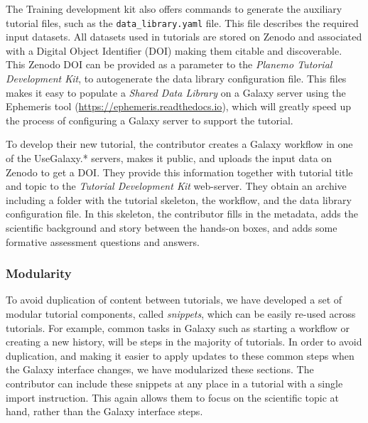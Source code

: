 \documentclass[10pt,letterpaper]{article}
\begin{document}

The Training development kit also offers commands to generate the auxiliary tutorial files, such as the \verb+data_library.yaml+ file.
This file describes the required input datasets. All datasets used in tutorials are stored on Zenodo and associated with a Digital Object Identifier (DOI) making them citable and discoverable.
This Zenodo DOI can be provided as a parameter to the \emph{Planemo Tutorial Development Kit}, to autogenerate the data library configuration file.
This files makes it easy to populate a \emph{Shared Data Library} on a Galaxy server using the Ephemeris tool (\url{https://ephemeris.readthedocs.io}), which will greatly speed up the process of configuring a Galaxy server to support the tutorial.

To develop their new tutorial, the contributor creates a Galaxy workflow in one of the UseGalaxy.* servers, makes it public, and uploads the input data on Zenodo to get a DOI. They provide this information together with tutorial title and topic to the \emph{Tutorial Development Kit} web-server. They obtain an archive including a folder with the tutorial skeleton, the workflow, and the data library configuration file. In this skeleton, the contributor fills in the metadata, adds the scientific background and story between the hands-on boxes, and adds some formative assessment questions and answers.

\subsubsection*{Modularity}

To avoid duplication of content between tutorials, we have developed a set of modular tutorial components, called \emph{snippets}, which can be easily re-used across tutorials.
For example, common tasks in Galaxy such as starting a workflow or creating a new history, will be steps in the majority of tutorials. In order to avoid duplication, and making it easier to apply updates to these common steps when the Galaxy interface changes, we have modularized these sections. The contributor can include these snippets at any place in a tutorial with a single import instruction. 
This again allows them to focus on the scientific topic at hand, rather than the Galaxy interface steps.
\end{document}
